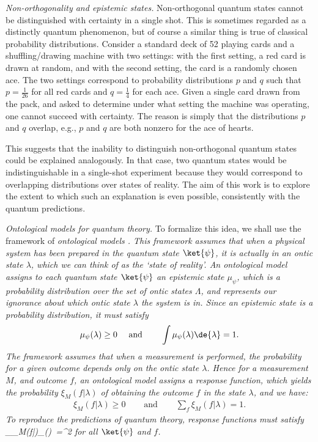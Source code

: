 \textit{Non-orthogonality and epistemic states.}
Non-orthogonal quantum states cannot be distinguished with certainty in a single shot. This is sometimes regarded as a distinctly quantum phenomenon, but of course a similar thing is true of classical probability distributions. Consider a standard deck of 52 playing cards and a shuffling/drawing machine with two settings: with the first setting, a red card is drawn at random, and with the second setting, the card is a randomly chosen ace. The two settings correspond to probability distributions $p$ and $q$ such that $p=\frac{1}{26}$ for all red cards and $q=\frac{1}{4}$ for each ace. Given a single card drawn from the pack, and asked to determine under what setting the machine was operating, one cannot succeed with certainty. The reason is simply that the distributions $p$ and $q$ overlap, e.g., $p$ and $q$ are both nonzero for the ace of hearts. 


This suggests that the inability to distinguish non-orthogonal quantum states could be explained analogously. In that case, two quantum states would be indistinguishable in a single-shot experiment because they would correspond to overlapping distributions over states of reality. The aim of this work is to explore the extent to which such an explanation is even possible, consistently with the quantum predictions.

\textit{Ontological models for quantum theory.} To formalize this idea, we shall use the framework  of \em ontological models \em \cite{Spekkens2005, Harrigan2010}. This framework assumes that when a physical system has been prepared in the quantum state $\ket{\psi}$, it is actually in an \em ontic state \em $\lambda$, which we can think of as the `state of reality'. An ontological model assigns to each quantum state $\ket{\psi}$ an \em epistemic state \em  $\mu_\psi$, which is a probability distribution over the set of ontic states $\Lambda$, and represents our ignorance about which ontic state $\lambda$ the system is in. Since an epistemic state is a probability distribution, it must satisfy
\begin{eqnarray} \label{eq:mu}
\mu_\psi(\lambda) \geq 0 & \quad\textrm{   and   }\quad & \int \mu_\psi(\lambda) \de{\lambda} =1.
\end{eqnarray}
The framework assumes that when a measurement is performed, the probability for a given outcome depends only on the ontic state $\lambda$. Hence for a measurement $M$, and outcome $f$, an ontological model assigns a \em response function\em, which yields the probability $\xi_M(f | \lambda)$ of obtaining the outcome $f$ in the state $\lambda$, and we have:
\begin{eqnarray}\label{eq:xi}
\xi_M(f | \lambda) \geq 0 & \quad\textrm{   and   }\quad & \sum_f \xi_M (f | \lambda) =1.
\end{eqnarray}
To reproduce the predictions of quantum theory, response functions must satisfy
\be\label{eq:bornrule}
\int_\Lambda \xi_M(f|\lambda)\mu_\psi(\lambda) \,\lambda=^2
\ee
for all $\ket{\psi}$ and $f$.


